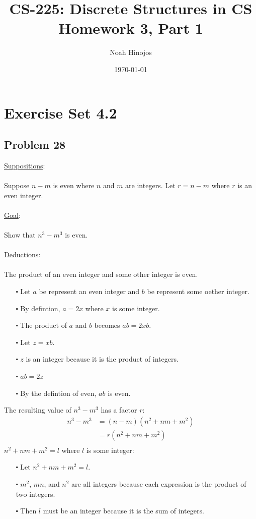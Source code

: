 \documentclass[12pt]{article}
\title{
  \textbf{CS-225: Discrete Structures in CS} \\
  Homework 3, Part 1
  }
\author{Noah Hinojos}
\date{\today}
\begin{document}
\maketitle

\section*{Exercise Set 4.2}

\subsection*{Problem 28}
\underline{Suppositions}:
\\ \\
Suppose $n-m$ is even where $n$ and $m$ are integers. Let $r = n-m$ where $r$ is an even integer.
\\ \\
\underline{Goal}:
\\ \\
Show that $n^3-m^3$ is even.
\\ \\
\underline{Deductions}:
\\ \\
The product of an even integer and some other integer is even.
\begin{itemize}
  \item [$\centerdot$] Let $a$ be represent an even integer and $b$ be represent some oether integer.
  \item [$\centerdot$] By defintion, $a = 2x$ where $x$ is some integer.
  \item [$\centerdot$] The product of $a$ and $b$ becomes $ab = 2xb$.
  \item [$\centerdot$] Let $z = xb$.
  \item [$\centerdot$] $z$ is an integer because it is the product of integers.
  \item [$\centerdot$] $ab = 2z$
  \item [$\centerdot$] By the defintion of even, $ab$ is even.
\end{itemize}
The resulting value of $n^3-m^3$ has a factor $r$: 
\begin{align*}
  n^3-m^3 &= (n-m)(n^2+nm+m^2)\\
  &= r(n^2+nm+m^2)\\
\end{align*}
 $n^2+nm+m^2 = l$ where $l$ is some integer:
\begin{itemize}
  \item [$\centerdot$] Let $n^2+nm+m^2 = l$.
  \item [$\centerdot$] $m^2$, $mn$, and $n^2$ are all integers because each expression is the product of two integers.
  \item [$\centerdot$] Then $l$ must be an integer because it is the sum of integers.
\end{itemize}
\end{document}
